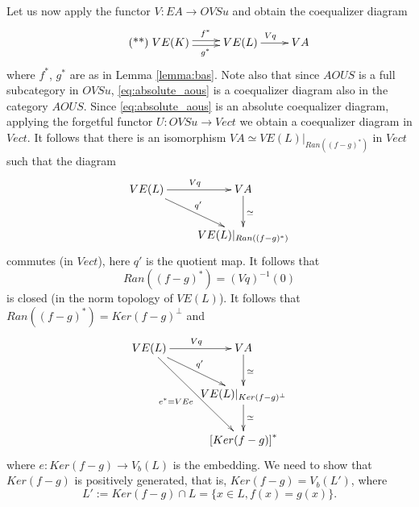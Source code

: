 \documentclass[12pt]{article}
\begin{document}
Let us now apply the functor $V:EA\to OVSu$ and  obtain the coequalizer diagram 
\begin{equation}\label{eq:absolute_aous}\tag{**}
\xymatrix{
VE(K) \ar@<.5ex>[r]^{f^*} \ar@<-.5ex>[r]_{g^*} &VE(L)\ar[r]^{Vq} & VA }
\end{equation}
where $f^*$, $g^*$ are as in Lemma \ref{lemma:bas}. Note also that since $AOUS$ is a full subcategory in $OVSu$,  \eqref{eq:absolute_aous}  is a coequalizer diagram also in the category $AOUS$. Since  \eqref{eq:absolute_aous} is an absolute coequalizer diagram, applying the forgetful functor $U: OVSu\to Vect$ we obtain a coequalizer diagram in $Vect$. It follows that there is an isomorphism $VA\simeq VE(L)|_{Ran((f-g)^*)}$ in $Vect$ such that the diagram
\[
\xymatrix{VE(L)\ar[r]^{Vq} \ar[rd]^{q'}& VA \ar[d]^{\simeq} \\  & VE(L)|_{Ran((f-g)^*)}} 
\] 
commutes (in $Vect$), here $q'$ is the quotient map. It follows that 
\[
Ran((f-g)^*)=(Vq)^{-1}(0)
\]
 is closed (in the norm topology of $VE(L)$). It follows that \cite{??} $Ran((f-g)^*)=Ker(f-g)^\perp$ and
\[
\xymatrix{VE(L)\ar[r]^{Vq} \ar[rd]^{q'} \ar[rdd]_{e^*=VEe}& VA \ar[d]^{\simeq} \\  & VE(L)|_{Ker(f-g)^\perp}\ar[d]^\simeq \\
& \left[Ker(f-g)\right]^*}
\]
where $e: Ker(f-g)\to V_b(L)$ is the embedding. We need to show that $Ker(f-g)$ is positively generated, that is, 
$Ker(f-g)=V_b(L')$, where 
\[
L':=Ker(f-g)\cap L=\{x\in L, f(x)=g(x)\}.
\]




 
\end{document}
